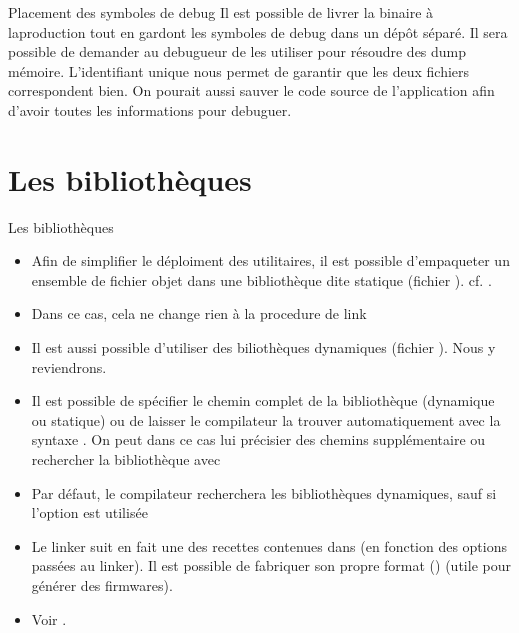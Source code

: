 \begin{frame}[fragile=singleslide]{Placement des symboles de debug}
  Il est possible de livrer  la binaire à laproduction tout en gardont
  les  symboles de debug  dans un  dépôt séparé.  Il sera  possible de
  demander  au  debugueur  de  les  utiliser pour  résoudre  des  dump
  mémoire. L'identifiant  unique nous permet de garantir  que les deux
  fichiers correspondent bien. On  pourait aussi sauver le code source
  de l'application afin d'avoir toutes les informations pour debuguer.
\end{frame}

\section{Les bibliothèques}

\begin{frame}[fragile=singleslide]{Les bibliothèques}
  \begin{itemize}
  \item  Afin de  simplifier  le déploiment  des  utilitaires, il  est
    possible  d'empaqueter  un  ensemble  de fichier  objet  dans  une
    bibliothèque dite statique (fichier ). cf. .
  \item Dans ce cas, cela ne change rien à la procedure de link
  \item Il  est aussi possible d'utiliser  des biliothèques dynamiques
    (fichier ). Nous y reviendrons.
  \item  Il  est  possible  de  spécifier  le  chemin  complet  de  la
    bibliothèque (dynamique ou statique)  ou de laisser le compilateur
    la trouver automatiquement avec la syntaxe .  On peut
    dans ce cas lui précisier des chemins supplémentaire ou rechercher
    la bibliothèque avec 
  \item  Par  défaut,  le  compilateur recherchera  les  bibliothèques
    dynamiques, sauf si l'option  est utilisée
  \item  Le  linker suit  en  fait  une  des recettes  contenues  dans
      (en fonction  des  options passées  au
    linker).   Il   est  possible  de  fabriquer   son  propre  format
    () (utile pour générer des firmwares).
  \item Voir .
  \end{itemize}
\end{frame}

